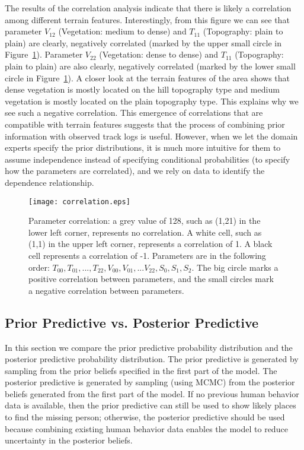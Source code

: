 The results of the correlation analysis indicate that there is likely a correlation among different terrain features. Interestingly, from this figure we can see that parameter $V_{12}$ (Vegetation: medium to dense) and $T_{11}$ (Topography: plain to plain) are clearly, negatively correlated (marked by the upper small circle in Figure~\ref{correlation}). Parameter $V_{22}$ (Vegetation: dense to dense) and $T_{11}$ (Topography: plain to plain) are also clearly, negatively correlated (marked by the lower small circle in Figure~\ref{correlation}). A closer look at the terrain features of the area shows that dense vegetation is mostly located on the hill topography type and medium vegetation is mostly located on the plain topography type. This explains why we see such a negative correlation. This emergence of correlations that are compatible with terrain features suggests that the process of combining prior information with observed track logs is useful. However, when we let the domain experts specify the prior distributions, it is much more intuitive for them to assume independence instead of specifying conditional probabilities (to specify how the parameters are correlated), and we rely on data to identify the dependence relationship.
\begin{figure}
\centering
\texttt{[image: correlation.eps]}
\caption[Parameter correlation]{Parameter correlation: a grey value of 128, such as (1,21) in the lower left corner, represents no correlation. A white cell, such as (1,1) in the upper left corner, represents a correlation of 1. A black cell represents a correlation of -1. Parameters are in the following order: $T_{00},T_{01},...,T_{22},V_{00},V_{01},...V_{22},S_{0},S_{1},S_{2}.$ The big circle marks a positive correlation between parameters, and the small circles mark a negative correlation between parameters.}
\label{correlation}
\end{figure}

\subsection{Prior Predictive vs. Posterior Predictive}
\label{sec:4.4}

In this section we compare the prior predictive probability distribution and the posterior predictive probability distribution. The prior predictive is generated by sampling from the prior beliefs specified in the first part of the model. The posterior predictive is generated by sampling (using MCMC) from the posterior beliefs generated from the first part of the model. If no previous human behavior data is available, then the prior predictive can still be used to show likely places to find the missing person; otherwise, the posterior predictive should be used because combining existing human behavior data enables the model to reduce uncertainty in the posterior beliefs.

